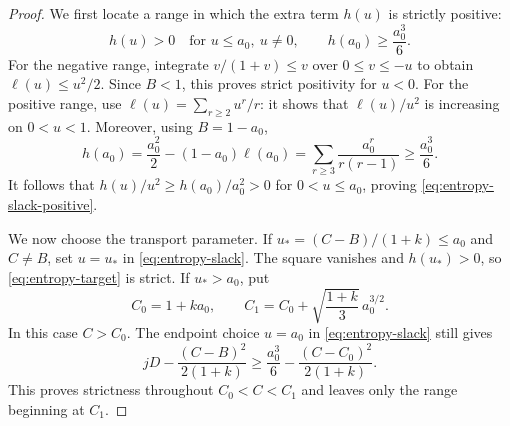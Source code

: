 \begin{proof}
We first locate a range in which the extra term $h(u)$ is strictly
positive:
\begin{equation}
 h(u)>0\quad\text{for }u\le a_0,\ u\ne0,
 \qquad h(a_0)\ge\frac{a_0^3}{6}.
 \label{eq:entropy-slack-positive}
\end{equation}
For the negative range, integrate $v/(1+v)\le v$ over
$0\le v\le -u$ to obtain $\ell(u)\le u^2/2$.  Since $B<1$, this
proves strict positivity for $u<0$.  For the positive range, use
$\ell(u)=\sum_{r\ge2}u^r/r$: it shows that $\ell(u)/u^2$ is increasing
on $0<u<1$.
Moreover, using $B=1-a_0$,
\[
 h(a_0)=\frac{a_0^2}{2}-(1-a_0)\ell(a_0)
       =\sum_{r\ge3}\frac{a_0^r}{r(r-1)}
       \ge\frac{a_0^3}{6}.
\]
It follows that $h(u)/u^2\ge h(a_0)/a_0^2>0$ for $0<u\le a_0$,
proving \eqref{eq:entropy-slack-positive}.

We now choose the transport parameter.  If
$u_*=(C-B)/(1+k)\le a_0$ and $C\ne B$, set $u=u_*$ in
\eqref{eq:entropy-slack}.  The square vanishes and $h(u_*)>0$, so
\eqref{eq:entropy-target} is strict.  If $u_*>a_0$, put
\[
 C_0=1+ka_0,
 \qquad C_1=C_0+\sqrt{\frac{1+k}{3}}\,a_0^{3/2}.
\]
In this case $C>C_0$.  The endpoint choice $u=a_0$ in
\eqref{eq:entropy-slack} still gives
\[
 jD-\frac{(C-B)^2}{2(1+k)}
 \ge \frac{a_0^3}{6}-\frac{(C-C_0)^2}{2(1+k)}.
\]
This proves strictness throughout $C_0<C<C_1$ and leaves only
the range beginning at $C_1$.


\end{proof}

